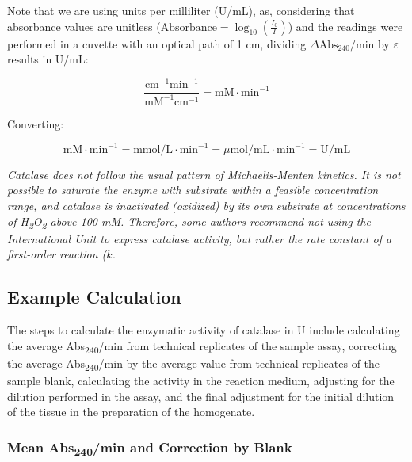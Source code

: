 \documentclass[
  9pt,
  american,
  a5paper,
  extrafontsizes,onecolumn,openright
  ]{memoir}
\newlength{\rf}
\begin{document}
Note that we are using units per milliliter (U/mL), as, considering that absorbance values are unitless (\(\text{Absorbance} = \log_{10} \left( \frac{I_0}{I} \right)\)) and the readings were performed in a cuvette with an optical path of 1 cm, dividing \(\Delta \text{Abs}_{240}/\text{min}\) by \(\varepsilon\) results in \(\text{U/mL}\):

\[ \frac{\text{cm}^{-1}\text{min}^{-1}}{\text{mM}^{-1}\text{cm}^{-1}} = \text{mM} \cdot \text{min}^{-1} \]

Converting:

\[ \text{mM} \cdot \text{min}^{-1} = \text{mmol/L} \cdot \text{min}^{-1} = \mu\text{mol/mL} \cdot \text{min}^{-1} = \text{U/mL} \]

\begin{greybox}[frametitle = Note]
\emph{Catalase does not follow the usual pattern of Michaelis-Menten kinetics. It is not possible to saturate the enzyme with substrate within a feasible concentration range, and catalase is inactivated (oxidized) by its own substrate at concentrations of H\textsubscript{2}O\textsubscript{2} above 100 mM. Therefore, some authors recommend not using the International Unit to express catalase activity, but rather the rate constant of a first-order reaction (\(k\).}

\end{greybox}

\subsection{Example Calculation}\label{example-calculation}

The steps to calculate the enzymatic activity of catalase in U include calculating the average Abs\textsubscript{240}/min from technical replicates of the sample assay, correcting the average Abs\textsubscript{240}/min by the average value from technical replicates of the sample blank, calculating the activity in the reaction medium, adjusting for the dilution performed in the assay, and the final adjustment for the initial dilution of the tissue in the preparation of the homogenate.

\subsubsection{\texorpdfstring{Mean Abs\textsubscript{240}/min and Correction by Blank}{Mean Abs240/min and Correction by Blank}}\label{mean-abs240min-and-correction-by-blank}
\end{document}
